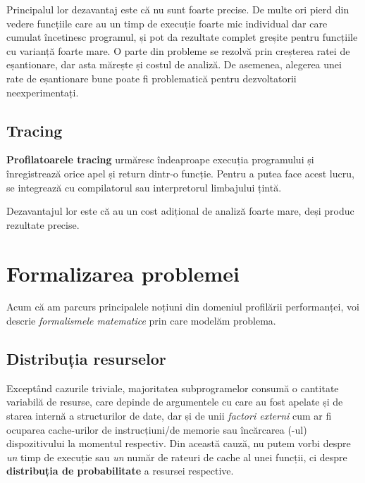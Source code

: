 Principalul lor dezavantaj este că nu sunt foarte precise. De multe ori pierd din vedere funcțiile care au un timp de execuție foarte mic individual dar care cumulat încetinesc programul, și pot da rezultate complet greșite pentru funcțiile cu varianță foarte mare. O parte din probleme se rezolvă prin creșterea ratei de eșantionare, dar asta mărește și costul de analiză. De asemenea, alegerea unei rate de eșantionare bune poate fi problematică pentru dezvoltatorii neexperimentați.


\subsection{Tracing}

\textbf{Profilatoarele tracing} urmăresc îndeaproape execuția programului și înregistrează orice apel și return dintr-o funcție. Pentru a putea face acest lucru, se integrează cu compilatorul sau interpretorul limbajului țintă.

Dezavantajul lor este că au un cost adițional de analiză foarte mare, deși produc rezultate precise.


\section{Formalizarea problemei}

Acum că am parcurs principalele noțiuni din domeniul profilării performanței, voi descrie \emph{formalismele matematice} prin care modelăm problema.

\subsection{Distribuția resurselor}

Exceptând cazurile triviale, majoritatea subprogramelor consumă o cantitate variabilă de resurse, care depinde de argumentele cu care au fost apelate și de starea internă a structurilor de date, dar și de unii \textit{factori externi} cum ar fi ocuparea cache-urilor de instrucțiuni/de memorie sau încărcarea (-ul) dispozitivului la momentul respectiv. Din această cauză, nu putem vorbi despre \emph{un} timp de execuție sau \emph{un} număr de rateuri de cache al unei funcții, ci despre \textbf{distribuția de probabilitate} a resursei respective.

